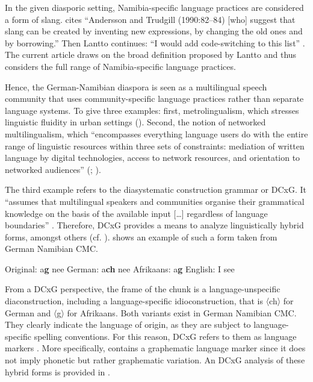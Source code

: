 \documentclass[output=paper]{langsci/langscibook}
\begin{document}
In the given diasporic setting, Namibia-specific language practices are considered a form of slang. \citet[634]{lantto_code-switching_2014} cites “Andersson and Trudgill (1990:82–84) [who] suggest that slang can be created by inventing new expressions, by changing the old ones and by borrowing.” Then Lantto continues: “I would add code-switching to this list” \citeyear[634]{lantto_code-switching_2014}. The current article draws on the broad definition proposed by Lantto and thus considers the full range of Namibia-specific language practices. 

Hence, the German-Namibian diaspora is seen as a multilingual speech community that uses community-specific language practices rather than separate language systems. To give three examples: first, metrolingualism, which stresses linguistic fluidity in urban settings (\citealt{otsuji_metrolingualism:_2010}). Second, the notion of networked multilingualism, which “encompasses everything language users do with the entire range of linguistic resources within three sets of constraints: mediation of written language by digital technologies, access to network resources, and orientation to networked audiences” (\citealt[185]{androutsopoulos_networked_2015}; \citealt{radke_urban_inpress}). 

The third example refers to the diasystematic construction grammar or DCxG. It “assumes that multilingual speakers and communities organise their grammatical knowledge on the basis of the available input […] regardless of language boundaries” \citep[2]{hoder_grammar_2018}. Therefore, DCxG provides a means to analyze linguistically hybrid forms, amongst others (cf. \citealt[23]{hoder_mehrsprachige_2018}).  shows an example of such a form taken from German Namibian CMC.


\ea
\label{ex:radke:1}
	\ea \label{ex:radke:1a} Original: a\textbf{g} nee 
	\ex \label{ex:radke:1b} German: a\textbf{ch} nee
	\ex \label{ex:radke:1c} Afrikaans: a\textbf{g}
	\ex \label{ex:radke:1d} English: I see
\z
\z

From a DCxG perspective, the frame of the chunk is a language-unspecific diaconstruction, including a language-specific idioconstruction, that is 〈ch〉 for German and 〈g〉 for Afrikaans. Both variants exist in German Namibian CMC. They clearly indicate the language of origin, as they are subject to language-specific spelling conventions. For this reason, DCxG refers to them as language markers \citep[23]{hoder_mehrsprachige_2018}. More specifically,  contains a graphematic language marker since it does not imply phonetic but rather graphematic variation. An DCxG analysis of these hybrid forms is provided in .
\end{document}
